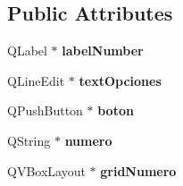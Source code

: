 \subsection*{Public Attributes}
\begin{DoxyCompactItemize}
\item 
\hypertarget{class_numero_ae868309035237d255665cc47e11f358e}{Q\-Label $\ast$ {\bfseries label\-Number}}\label{class_numero_ae868309035237d255665cc47e11f358e}

\item 
\hypertarget{class_numero_a05c25be5d0eec99f68ecee2d362a1006}{Q\-Line\-Edit $\ast$ {\bfseries text\-Opciones}}\label{class_numero_a05c25be5d0eec99f68ecee2d362a1006}

\item 
\hypertarget{class_numero_a72aae20a1d5d8722c9da4fa8e97d4efc}{Q\-Push\-Button $\ast$ {\bfseries boton}}\label{class_numero_a72aae20a1d5d8722c9da4fa8e97d4efc}

\item 
\hypertarget{class_numero_a47f3d0b00a7f0c276326be98accb8afa}{Q\-String $\ast$ {\bfseries numero}}\label{class_numero_a47f3d0b00a7f0c276326be98accb8afa}

\item 
\hypertarget{class_numero_a0bc927bca35e660e7e1a00e9107ef581}{Q\-V\-Box\-Layout $\ast$ {\bfseries grid\-Numero}}\label{class_numero_a0bc927bca35e660e7e1a00e9107ef581}

\end{DoxyCompactItemize}


